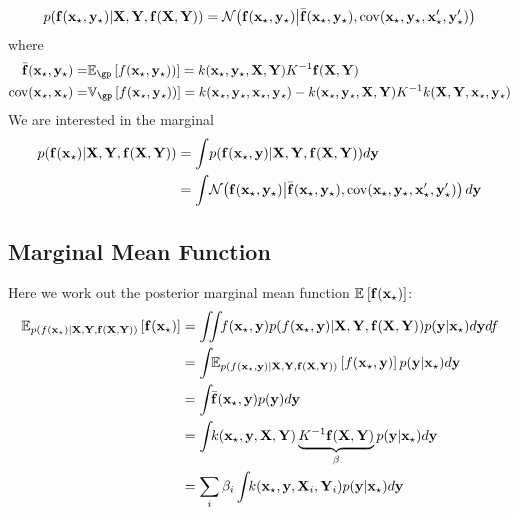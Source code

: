 \begin{align}
p({\bf{f}}({\bf{x}}_\star, {\bf{y}}_\star)|\mathbf{X}, \mathbf{Y}, {\bf{f}}(\mathbf{X}, \mathbf{Y})) = \mathcal{N}\!\left({\bf{f}}({\bf{x}}_\star, {\bf{y}}_\star) \middle| \bar{{\bf{f}}}({\bf{x}}_\star, {\bf{y}}_\star),\operatorname{cov}({\bf{x}}_\star, {\bf{y}}_\star,{\bf{x}}_\star', {\bf{y}}_\star')\right)
\end{align} 
where
\begin{align}
\mf(\vx\st, \vy\st) = & \expect_\gp \left[ f(\vx\st, \vy\st))\right] = k(\vx\st, \vy\st, \vX, \vY) K^{-1} \vf(\vX, \vY) \\
\cov(\vx\st, \vx\st) = & \variance_\gp \left[ f(\vx\st, \vy\st))\right] = k(\vx\st, \vy\st, \vx\st, \vy\st) - k(\vx\st, \vy\st, \vX, \vY) K^{-1} k(\vX, \vY, \vx\st, \vy\st)
\end{align} 
We are interested in the marginal
\begin{align}
p({\bf{f}}({\bf{x}}_\star)|\mathbf{X}, \mathbf{Y}, {\bf{f}}(\mathbf{X}, \mathbf{Y})) & = \int\! p({\bf{f}}({\bf{x}}_\star, {\bf{y}})|\mathbf{X}, \mathbf{Y}, {\bf{f}}(\mathbf{X}, \mathbf{Y})) d{\bf{y}} \\
& = \int\! \mathcal{N}\!\left({\bf{f}}({\bf{x}}_\star, {\bf{y}}_\star) \middle| \bar{{\bf{f}}}({\bf{x}}_\star, {\bf{y}}_\star),\operatorname{cov}({\bf{x}}_\star, {\bf{y}}_\star,{\bf{x}}_\star', {\bf{y}}_\star')\right) d{\bf{y}}
\end{align} 

\subsection{Marginal Mean Function}
Here we work out the posterior marginal mean function $\mathbb{E}_{} \left[ {{\bf{f}}({\bf{x}}_\star)} \right]$:
\begin{align}
\expectargs{ p(f(\vx\st)|\vX, \vY, \vf(\vX, \vY))}{\vf(\vx\st)} & = \int\!\!\! \int\!\! f(\vx\st, \vy) p(f(\vx\st, \vy)|\vX, \vY, \vf(\vX, \vY)) p(\vy | \vx\st) d\vy df\\
& = \int\!\! \expectargs {p(f(\vx\st, \vy)|\vX, \vY, \vf(\vX, \vY))}{ f(\vx\st, \vy)} p(\vy | \vx\st) d\vy \\
& = \int\!\! \mf(\vx\st, \vy) p(\vy) d\vy \\
& = \int\!\! k(\vx\st, \vy, \vX, \vY) \underbrace{K^{-1} \vf(\vX, \vY)}_{\beta} p(\vy | \vx\st) d\vy \\
& = \sum_i \beta_i \int\!\! k(\vx\st, \vy, \vX_i, \vY_i) p(\vy | \vx\st) d\vy
\label{eq:marg_mean_symbolic}
\end{align} 

